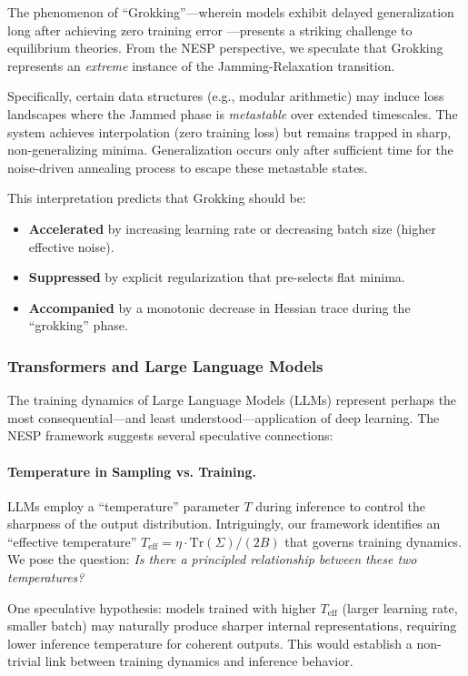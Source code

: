 The phenomenon of ``Grokking''---wherein models exhibit delayed generalization long after achieving zero training error \cite{Power2022Grokking}---presents a striking challenge to equilibrium theories. From the NESP perspective, we speculate that Grokking represents an \textit{extreme} instance of the Jamming-Relaxation transition.

Specifically, certain data structures (e.g., modular arithmetic) may induce loss landscapes where the Jammed phase is \textit{metastable} over extended timescales. The system achieves interpolation (zero training loss) but remains trapped in sharp, non-generalizing minima. Generalization occurs only after sufficient time for the noise-driven annealing process to escape these metastable states.

This interpretation predicts that Grokking should be:
\begin{itemize}[topsep=1pt,itemsep=1pt]
    \item \textbf{Accelerated} by increasing learning rate or decreasing batch size (higher effective noise).
    \item \textbf{Suppressed} by explicit regularization that pre-selects flat minima.
    \item \textbf{Accompanied} by a monotonic decrease in Hessian trace during the ``grokking'' phase.
\end{itemize}

\subsubsection{Transformers and Large Language Models}

The training dynamics of Large Language Models (LLMs) represent perhaps the most consequential---and least understood---application of deep learning. The NESP framework suggests several speculative connections:

\paragraph{Temperature in Sampling vs. Training.} LLMs employ a ``temperature'' parameter $T$ during inference to control the sharpness of the output distribution. Intriguingly, our framework identifies an ``effective temperature'' $T_{\text{eff}} = \eta \cdot \mathrm{Tr}(\Sigma)/(2B)$ that governs training dynamics. We pose the question: \textit{Is there a principled relationship between these two temperatures?}

One speculative hypothesis: models trained with higher $T_{\text{eff}}$ (larger learning rate, smaller batch) may naturally produce sharper internal representations, requiring lower inference temperature for coherent outputs. This would establish a non-trivial link between training dynamics and inference behavior.

